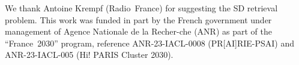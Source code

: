 \documentclass[sigconf,nonacm]{acmart}
\newcommand{\0}{\phantom{0}}
\begin{document}








\begin{acks}
  We thank Antoine Krempf (Radio~France) for suggesting the SD retrieval problem.
  This work was funded in part by the French government under management of
Agence Nationale de la  Recher-che (ANR) as part of the ``France~2030'' program,
reference ANR-23-IACL-0008 (PR[AI]RIE-PSAI) and ANR-23-IACL-005 (Hi! PARIS Cluster 2030).
\end{acks}





\end{document}
